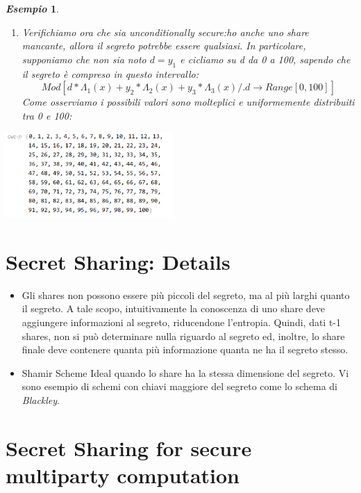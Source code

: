 \documentclass{book}
\newtheorem{esempio}{\emph{Esempio}}
\begin{document}
\begin{esempio}
\begin{enumerate}
\begin{equation*}
              \end{equation*}
        \item Verifichiamo ora che sia unconditionally secure: ho anche uno share mancante, allora il segreto potrebbe essere qualsiasi\@. In particolare, supponiamo che non sia noto \(d=y_{1}\) e cicliamo su d da 0 a 100, sapendo che il segreto è compreso in questo intervallo:
              \begin{equation*}
                  Mod[d*\Lambda_{1}(x)+y_{2}*\Lambda_{2}(x)+y_{3}*\Lambda_{3}(x)/.{d\rightarrow Range[0,100]}]
              \end{equation*}
              Come osserviamo i possibili valori sono molteplici e uniformemente distribuiti tra 0 e 100:
    \end{enumerate}
\end{esempio}
\begin{center}
    \includegraphics[width=0.48\textwidth]{2021-12-29-10-57-00.png}%
\end{center}
\section{Secret Sharing: Details}\begin{itemize}
    \item Gli shares non possono essere più piccoli del segreto, ma al più larghi quanto il segreto\@. A tale scopo, intuitivamente la conoscenza di uno share deve aggiungere informazioni al segreto, riducendone l'entropia\@. Quindi, dati t-1 shares, non si può determinare nulla riguardo al segreto ed, inoltre, lo share finale deve contenere quanta più informazione quanta ne ha il segreto stesso\@.
    \item Shamir Scheme Ideal quando lo share ha la stessa dimensione del segreto\@. Vi sono esempio di schemi con chiavi maggiore del segreto come lo schema di \emph{Blackley}\@.
\end{itemize}
\section{Secret Sharing for secure multiparty computation}
\end{document}
